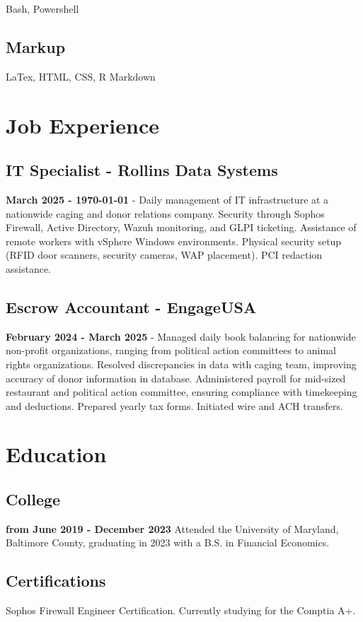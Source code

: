 \documentclass{article}
\begin{document}
Bash, Powershell

\subsection{Markup}

LaTex, HTML, CSS, R Markdown


\section{Job Experience}

\subsection{IT Specialist - Rollins Data Systems}
\textbf{March 2025 - \monthyeardate\today} - Daily management of IT infrastructure at a nationwide caging and donor relations company. Security through Sophos Firewall, Active Directory, Wazuh monitoring, and GLPI ticketing. Assistance of remote workers with vSphere Windows environments. Physical security setup (RFID door scanners, security cameras, WAP placement). PCI redaction assistance. 

\subsection{Escrow Accountant - EngageUSA}
\textbf{February 2024 - March 2025} - Managed daily book balancing for nationwide non-profit organizations, ranging from political action committees to animal rights organizations. Resolved discrepancies in data with caging team, improving accuracy of donor information in database. Administered payroll for mid-sized restaurant and political action committee, ensuring compliance with timekeeping and deductions. Prepared yearly tax forms. Initiated wire and ACH transfers.  

\section{Education}

\subsection{College} \textbf{from June 2019 - December 2023}
Attended the University of Maryland, Baltimore County, graduating in 2023 with a B.S. in Financial Economics. 

\subsection{Certifications}

Sophos Firewall Engineer Certification. Currently studying for the Comptia A+. 
\end{document}
